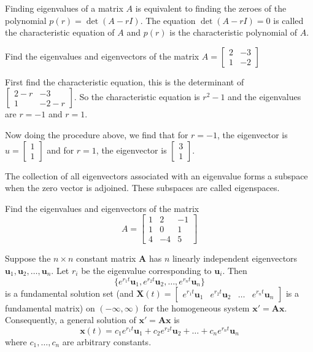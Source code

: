 \documentclass[../diffeq.tex]{subfiles}
\begin{document}
Finding eigenvalues of a matrix $A$ is equivalent to finding the zeroes of the polynomial $p(r)=\det (A-rI)$. The equation $\det (A-rI)=0$ is called the characteristic equation of $A$ 
and $p(r)$ is the characteristic polynomial of $A$.

\pagebreak
\begin{example}
    Find the eigenvalues and eigenvectors of the matrix $A=\begin{bmatrix}
        2 & -3\\
        1 & -2
    \end{bmatrix}$

    First find the characteristic equation, this is the determinant of $\begin{bmatrix}
        2-r & -3\\
        1 & -2-r
    \end{bmatrix}$. So the characteristic equation is $r^2-1$ and the eigenvalues are $r=-1$ and $r=1$.

    Now doing the procedure above, we find that for $r=-1$, the eigenvector is $u=\begin{bmatrix}
        1\\1
    \end{bmatrix}$ and for $r=1$, the eigenvector is $\begin{bmatrix}
        3\\1
    \end{bmatrix}$.
\end{example}
The collection of all eigenvectors associated with an eigenvalue forms a subspace when the zero vector is adjoined. These subspaces are called eigenspaces.

\ex Find the eigenvalues and eigenvectors of the matrix 
\[A = \begin{bmatrix} 
    1 & 2 & -1 \\
    1 & 0 & 1\\
    4 & -4 & 5
    \end{bmatrix}\]

\begin{theorem}
    Suppose the $n\times n$ constant matrix $\textbf{A}$ has $n$ linearly independent eigenvectors $\textbf{u}_1,\textbf{u}_2,\dots,\textbf{u}_n$. Let $r_i$ be the eigenvalue corresponding to $\textbf{u}_i$. Then 
    \[ \{ e^{r_1t}\textbf{u}_1,e^{r_2t}\textbf{u}_2,\dots,e^{r_nt}\textbf{u}_n \} \]
    is a fundamental solution set (and $\textbf{X}(t)=\begin{bmatrix}
        e^{r_1t}\textbf{u}_1 & e^{r_2t}\textbf{u}_2 & \dots & e^{r_nt}\textbf{u}_n
    \end{bmatrix}$ is a fundamental matrix) on $(-\infty,\infty)$ for the homogeneous system $\textbf{x}'=\textbf{Ax}$. Consequently, a general solution of $\textbf{x}'=\textbf{Ax}$ is 
    \[ \textbf{x}(t)=c_1e^{r_1t}\textbf{u}_1+c_2e^{r_2t}\textbf{u}_2+\dots + c_ne^{r_nt}\textbf{u}_n \]
    where $c_1,\dots,c_n$ are arbitrary constants.
\end{theorem}
\end{document}
